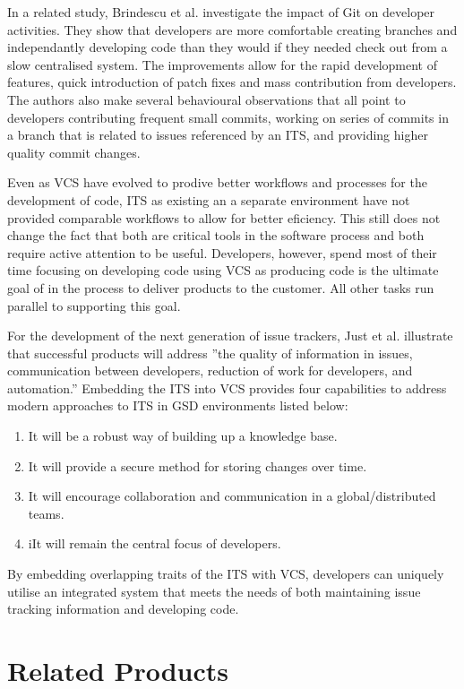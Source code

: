 \documentclass{mproj}
\begin{document}
In a related study, Brindescu et al. \cite{Brindescu:2014} investigate the impact of Git on developer activities. They show that developers are more comfortable creating branches and independantly developing code than they would if they needed check out from a slow centralised system. The improvements allow for the rapid development of features, quick introduction of patch fixes and mass contribution from developers. The authors also make several behavioural observations that all point to developers contributing frequent small commits, working on series of commits in a branch that is related to issues referenced by an ITS, and providing higher quality commit changes.

Even as VCS have evolved to prodive better workflows and processes for the development of code, ITS as existing an a separate environment have not provided comparable workflows to allow for better eficiency. This still does not change the fact that both are critical tools in the software process and both require active attention to be useful. Developers, however, spend most of their time focusing on developing code using VCS as producing code is the ultimate goal of in the process to deliver products to the customer. All other tasks run parallel to supporting this goal.

For the development of the next generation of issue trackers, Just et al. \cite{Just:2008} illustrate that successful products will address ”the quality of information in issues, communication between developers, reduction of work for developers, and automation.” Embedding the ITS into VCS provides four capabilities to address modern approaches to ITS in GSD environments listed below:

\begin{enumerate}
  \item It will be a robust way of building up a knowledge base. 
  \item It will provide a secure method for storing changes over time.
  \item It will encourage collaboration and communication in a global/distributed teams.
  \item iIt will remain the central focus of developers.
\end{enumerate}

By embedding overlapping traits of the ITS with VCS, developers can uniquely utilise an integrated system that meets the needs of both maintaining issue tracking information and developing code.


\section{Related Products}
\end{document}
